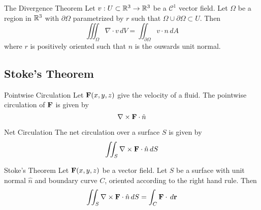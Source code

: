 \documentclass[a4paper]{article}
\begin{document}
\begin{thm}{The Divergence Theorem}{} Let $v:U\subset\mathbb{R}^3\to\mathbb{R}^3$ be a $\mathcal{C}^1$ vector field. Let $\Omega$ be a region in $\mathbb{R}^3$ with $\partial\Omega$ parametrized by $r$ such that $\Omega\cup\partial\Omega\subset U$. Then $$\iiint_\Omega\nabla\cdot v\,dV=\iint_{\partial\Omega} v\cdot n\,dA$$ where $r$ is positively oriented such that $n$ is the ouwards unit normal. 
\end{thm}

\subsection{Stoke's Theorem}
\begin{defn}{Pointwise Circulation}{} Let $\vb{F}(x,y,z)$ give the velocity of a fluid. The pointwise circulation of $\vb{F}$ is given by $$\nabla\times\vb{F}\cdot\hat{n}$$
\end{defn}

\begin{thm}{Net Circulation}{} The net circulation over a surface $S$ is given by $$\iint_S\nabla\times\vb{F}\cdot\hat{n}\,dS$$
\end{thm}

\begin{thm}{Stoke's Theorem}{} Let $\vb{F}(x,y,z)$ be a vector field. Let $S$ be a surface with unit normal $\hat{n}$ and boundary curve $C$, oriented according to the right hand rule. Then $$\iint_S\nabla\times\vb{F}\cdot\hat{n}\,dS=\int_C\vb{F}\cdot\,d\vb{r}$$
\end{thm}
\end{document}
